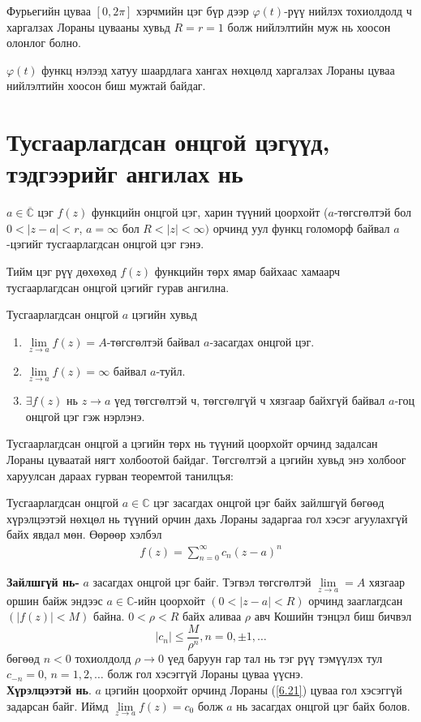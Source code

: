 Фурьегийн цуваа $[0,2\pi]$ хэрчмийн цэг бүр дээр $\varphi (t)$-рүү нийлэх тохиолдолд ч харгалзах Лораны цувааны хувьд $R=r=1$ болж нийлэлтийн муж нь хоосон олонлог болно.

$\varphi (t)$ функц нэлээд хатуу шаардлага хангах нөхцөлд харгалзах Лораны цуваа нийлэлтийн хоосон биш мужтай байдаг.
\section{Тусгаарлагдсан онцгой цэгүүд,\\
тэдгээрийг ангилах нь
}
\begin{dfn}
$a\in\overline{\mathbb{C}}$ цэг $f(z)$ функцийн онцгой цэг, харин түүний цоорхойт ($a$-төгсгөлтэй бол $0<|z-a|<r$, $a=\infty$ бол $R<|z|<\infty)$ орчинд уул функц голоморф байвал $a$-цэгийг тусгаарлагдсан онцгой цэг  гэнэ.

Тийм цэг рүү дөхөхөд $f(z)$ функцийн төрх ямар байхаас хамаарч тусгаарлагдсан онцгой цэгийг гурав ангилна. 
\end{dfn}
\begin{dfn}
Тусгаарлагдсан онцгой $a$ цэгийн хувьд
\begin{enumerate}
    \item [I.] $\lim\limits_{z\rightarrow a} f(z)=A$-төгсгөлтэй байвал $a$-засагдах онцгой цэг. 
    \item [II.] $\lim\limits_{z\rightarrow a} f(z)=\infty$ байвал $a$-туйл.
     \item [III.] $\exists f(z)$ нь $z\rightarrow a$ үед төгсгөлтэй ч, төгсгөлгүй ч хязгаар байхгүй байвал $a$-гоц онцгой цэг гэж нэрлэнэ.
\end{enumerate}

Тусгаарлагдсан онцгой а цэгийн төрх нь түүний цоорхойт орчинд задалсан Лораны цуваатай нягт холбоотой байдаг. Төгсгөлтэй а цэгийн хувьд энэ холбоог харуулсан дараах гурван теоремтой танилцъя:
\end{dfn}
\begin{thm}
Тусгаарлагдсан онцгой $a\in\mathbb{C}$ цэг засагдах онцгой цэг байх зайлшгүй бөгөөд хүрэлцээтэй нөхцөл нь түүний орчин дахь Лораны задаргаа гол хэсэг агуулахгүй байх явдал мөн. Өөрөөр хэлбэл
\begin{eqnarray} \label{6.21}
f(z)=\sum\limits_{n=0}^\infty c_n(z-a)^n
\end{eqnarray}
\end{thm}
\begin{prf}
\textbf{Зайлшгүй нь- } $a$ засагдах онцгой цэг байг. Тэгвэл төгсгөлтэй $\lim\limits_{z\rightarrow a}=A$ хязгаар оршин байж эндээс $a\in\mathbb{C}$-ийн цоорхойт $(0<|z-a|<R)$ орчинд зааглагдсан $(|f(z)|<M)$ байна. $0<\rho <R$ байх аливаа $\rho$ авч Кошийн тэнцэл биш бичвэл
$$|c_n|\leq \frac{M}{\rho^n}, n=0, \pm 1, \ldots$$
бөгөөд $n<0$ тохиолдолд $\rho\rightarrow 0$ үед баруун гар тал нь тэг рүү тэмүүлэх тул $c_{-n}=0$, $n=1,2,\ldots$ болж гол хэсэггүй Лораны цуваа үүснэ.\\
\textbf{Хүрэлцээтэй нь}. $a$ цэгийн цоорхойт орчинд Лораны (\ref{6.21}) цуваа гол хэсэггүй задарсан байг. Иймд $\lim\limits_{z\rightarrow a}f(z)=c_0$ болж $a$ нь засагдах онцгой цэг байх болов.
 \end{prf}
